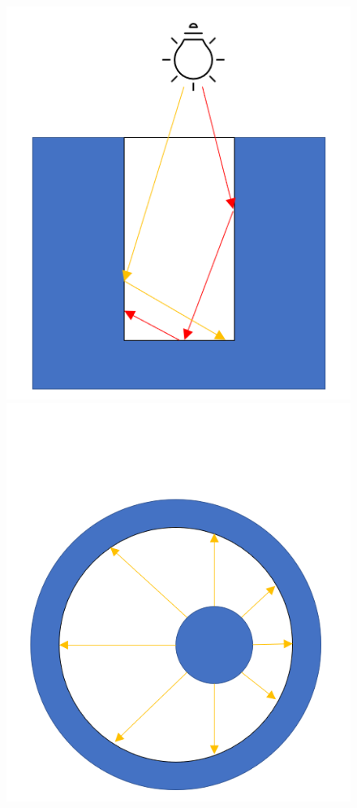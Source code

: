 \begin{figure}[!htb]
	  \includegraphics[width=\linewidth]{res/trench_with_rays.png}
	\endminipage\hfill
	  \includegraphics[width=\linewidth]{res/benchmark_setup.png}

\end{figure}
